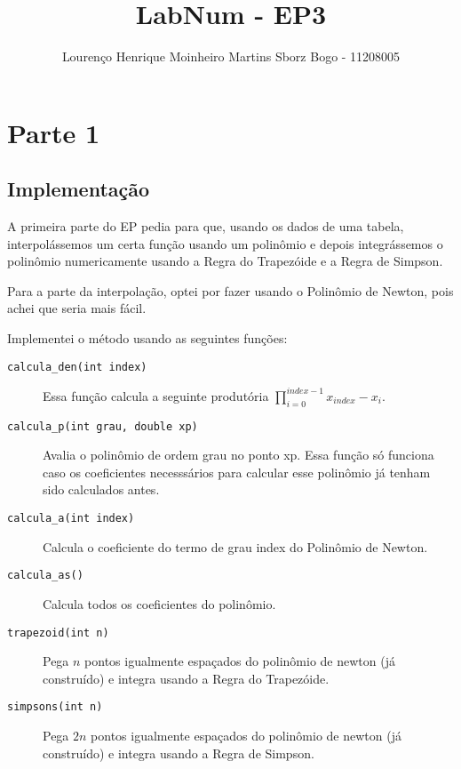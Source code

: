 \documentclass[12pt]{article}
\title{LabNum - EP3}
\author{Lourenço Henrique Moinheiro Martins Sborz Bogo - 11208005}
\date{}
\newcommand{\product}[3]{\displaystyle\prod_{#1}^#2 #3}
\begin{document}
\maketitle

\tableofcontents

\newpage

\section{Parte 1}

\subsection{Implementação}

A primeira parte do EP pedia para que, usando os dados de uma tabela, interpolássemos um certa função usando um polinômio e depois integrássemos o polinômio numericamente usando a Regra do Trapezóide e a Regra de Simpson.

Para a parte da interpolação, optei por fazer usando o Polinômio de Newton, pois achei que seria mais fácil.

Implementei o método usando as seguintes funções:

\begin{description}
  
\item[\texttt{calcula\_den(int index)}] Essa função calcula a seguinte produtória $\product{i=0}{{index-1}}{x_{index}-x_i}$.
  
\item[\texttt{calcula\_p(int grau, double xp)}] Avalia o polinômio de ordem grau no ponto xp. Essa função só funciona caso os coeficientes necesssários para calcular esse polinômio já tenham sido calculados antes.
  
\item[\texttt{calcula\_a(int index)}] Calcula o coeficiente do termo de grau index do Polinômio de Newton.
  
\item[\texttt{calcula\_as()}] Calcula todos os coeficientes do polinômio.
  
\item[\texttt{trapezoid(int n)}] Pega $n$ pontos igualmente espaçados do polinômio de newton (já construído) e integra usando a Regra do Trapezóide.
  
\item[\texttt{simpsons(int n)}] Pega $2n$ pontos igualmente espaçados do polinômio de newton (já construído) e integra usando a Regra de Simpson.
  
\end{description}
\end{document}

